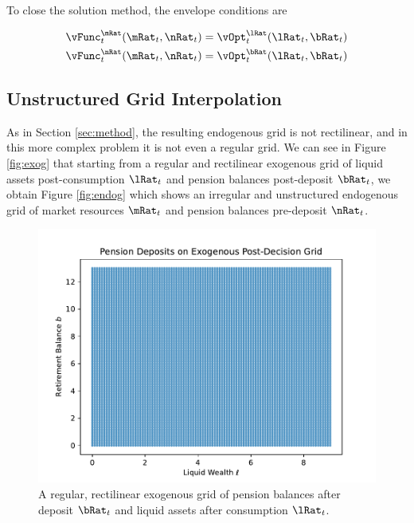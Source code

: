 \documentclass[\econtexRoot/SequentialEGM]{subfiles}
\begin{document}
To close the solution method, the envelope conditions are

\begin{equation}
	\begin{split}
		\vFunc_{t}^{\mRat}(\mRat_{t}, \nRat_{t}) & =
		\vOpt_{t}^{\lRat}(\lRat_{t}, \bRat_{t}) \\
		\vFunc_{t}^{\nRat}(\mRat_{t}, \nRat_{t}) & =
		\vOpt_{t}^{\bRat}(\lRat_{t}, \bRat_{t})
	\end{split}
\end{equation}

\subsection{Unstructured Grid Interpolation}

As in Section \ref{sec:method}, the resulting endogenous grid is not rectilinear, and in this more complex problem it is not even a regular grid. We can see in Figure \ref{fig:exog} that starting from a regular and rectilinear exogenous grid of liquid assets post-consumption $\lRat_{t}$ and pension balances post-deposit $\bRat_{t}$, we obtain Figure \ref{fig:endog} which shows an irregular and unstructured endogenous grid of market resources $\mRat_{t}$ and pension balances pre-deposit $\nRat_{t}$.

\begin{figure}
	\centering
	\includegraphics[width=0.8\linewidth]{Figures/ExogenousGrid.pdf}
	\caption{A regular, rectilinear exogenous grid of pension balances after deposit $\bRat_{t}$ and liquid assets after consumption $\lRat_{t}$.}
	\notinsubfile{\label{fig:exog}}
\end{figure}
\end{document}

